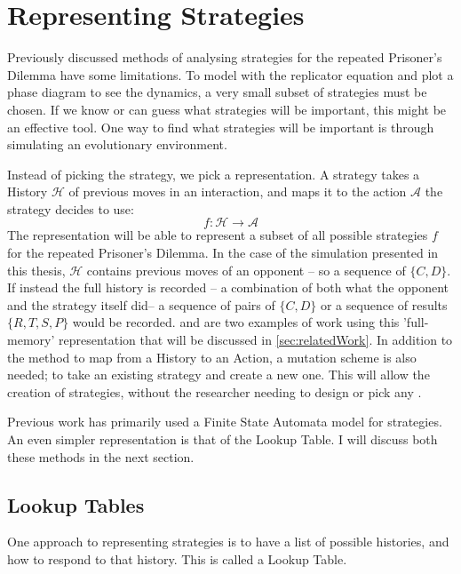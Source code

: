 \documentclass[a4paper,11pt,bcshonoursthesis,singlespace,oneside,thesisdraft,pdflatex]{cssethesis}
\begin{document}
\section{Representing Strategies}
Previously discussed methods of analysing strategies for the repeated Prisoner's Dilemma have some limitations. 
To model with the replicator equation and plot a phase diagram to see the dynamics, a very small subset of strategies must be chosen. 
If we know or can guess what strategies will be important, this might be an effective tool. 
One way to find what strategies will be important is through simulating an evolutionary environment. 

Instead of picking the strategy, we pick a representation. 
A strategy takes a History $\mathcal{H}$ of previous moves in an interaction, and maps it to the action $\mathcal{A}$ the strategy decides to use:
\begin{equation}
f: \mathcal{H} \rightarrow \mathcal{A}
\end{equation}
The representation will be able to represent a subset of all possible strategies $f$ for the repeated Prisoner's Dilemma. 
In the case of the simulation presented in this thesis, $\mathcal{H}$ contains previous moves of an opponent -- so a sequence of $\{C,D\}$. 
If instead the full history is recorded -- a combination of both what the opponent and the strategy itself did-- a sequence of pairs of $\{C,D\}$ or a sequence of results $\{R,T,S,P\}$ would be recorded. \citet{axelrod1987evolution} and \citet{fogel1993evolving} are two examples of work using this 'full-memory' representation that will be discussed in \ref{sec:relatedWork}.
In addition to the method to map from a History to an Action, a mutation scheme is also needed; to take an existing strategy and create a new one. 
This will allow the creation of strategies, without the researcher needing to design or pick any \citep{koza}. 

Previous work has primarily used a Finite State Automata model for strategies. 
An even simpler representation is that of the Lookup Table. 
I will discuss both these methods in the next section. 
\subsection{Lookup Tables}
\label{sec:mutation}
One approach to representing strategies is to have a list of possible histories, and how to respond to that history. This is called a Lookup Table. 
\end{document}
